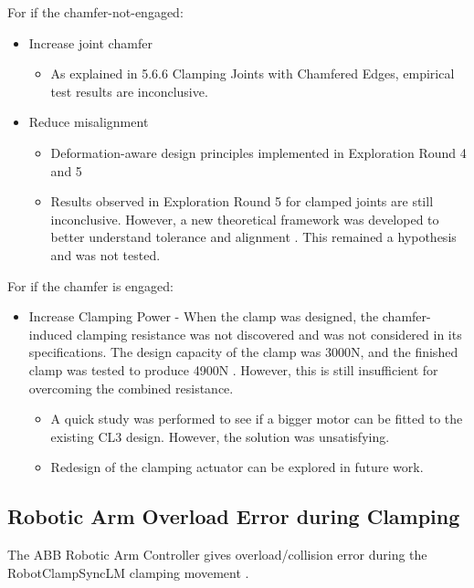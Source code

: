 For if the chamfer-not-engaged:
\begin{itemize}
    \item Increase joint chamfer
    \begin{itemize}
        \item As explained in 5.6.6 Clamping Joints with Chamfered Edges, empirical test results are inconclusive.
    \end{itemize}
    \item Reduce misalignment 
    \begin{itemize}
        \item Deformation-aware design principles implemented in Exploration Round 4 and 5
        \item Results observed in Exploration Round 5 for clamped joints are still inconclusive. However, a new theoretical framework was developed to better understand tolerance and alignment . This remained a hypothesis and was not tested.
    \end{itemize}
\end{itemize}

For if the chamfer is engaged:
\begin{itemize}
    \item Increase Clamping Power - When the clamp was designed, the chamfer-induced clamping resistance was not discovered and was not considered in its specifications. The design capacity of the clamp was 3000N, and the finished clamp was tested to produce 4900N . However, this is still insufficient for overcoming the combined resistance.
    \begin{itemize}
        \item A quick study was performed to see if a bigger motor can be fitted to the existing CL3 design. However, the solution was unsatisfying.
        \item Redesign of the clamping actuator can be explored in future work.
    \end{itemize}
\end{itemize}

\subsection{Robotic Arm Overload Error during Clamping}
\label{subsection:exploration-2-robotic-arm-overload-error-during-clamping}

The ABB Robotic Arm Controller gives overload/collision error during the RobotClampSyncLM clamping movement .

